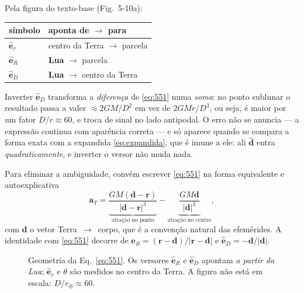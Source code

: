 \documentclass[11pt,a4paper,oneside]{report}
\theoremstyle{definition}
\theoremstyle{plain}
\theoremstyle{remark}
\newcommand{\vect}[1]{\bm{#1}}
\newcommand{\uvec}[1]{\hat{\bm{#1}}}
\begin{document}
\begin{alerta}
Pela figura do texto-base (Fig.~5-10a):
\begin{center}
\begin{tabular}{@{}ll@{}}
\toprule
símbolo & aponta de $\to$ para \\
\midrule
$\uvec{e}_r$ & centro da Terra $\to$ parcela \\
$\uvec{e}_R$ & \textbf{Lua} $\to$ parcela \\
$\uvec{e}_D$ & \textbf{Lua} $\to$ centro da Terra \\
\bottomrule
\end{tabular}
\end{center}
Inverter $\uvec{e}_D$ transforma a \emph{diferença} de \eqref{eq:551} numa
\emph{soma}: no ponto sublunar o resultado passa a valer $\approx 2GM/D^{2}$ em
vez de $2GMr/D^{3}$, ou seja, é maior por um fator $D/r\approx 60$, e troca de
sinal no lado antipodal. O erro não se anuncia — a expressão continua com
aparência correta — e só aparece quando se compara a forma exata com a expandida
\eqref{eq:expandida}, que é imune a ele: ali $\uvec{d}$ entra
\emph{quadraticamente}, e inverter o versor não muda nada.
\end{alerta}

Para eliminar a ambiguidade, convém escrever \eqref{eq:551} na forma
equivalente e autoexplicativa
\begin{equation}
\vect{a}_T=\underbrace{\frac{GM(\vect{d}-\vect{r})}{|\vect{d}-\vect{r}|^{3}}}
_{\text{atração no ponto}}
-\underbrace{\frac{GM\vect{d}}{|\vect{d}|^{3}}}_{\text{atração no centro}},
\label{eq:exata}
\end{equation}
com $\vect{d}$ o vetor Terra~$\to$~corpo, que é a convenção natural das
efemérides. A identidade com \eqref{eq:551} decorre de
$\uvec{e}_R=(\vect{r}-\vect{d})/|\vect{r}-\vect{d}|$ e
$\uvec{e}_D=-\vect{d}/|\vect{d}|$.

\begin{figure}[htbp]
\centering
{}
\caption{Geometria da Eq.~\eqref{eq:551}. Os versores $\uvec{e}_R$ e
$\uvec{e}_D$ apontam \emph{a partir da Lua}; $\uvec{e}_r$ e $\theta$ são
medidos no centro da Terra. A figura não está em escala:
$D/r_\oplus\approx 60$.}
\label{fig:geometria}
\end{figure}
\end{document}
